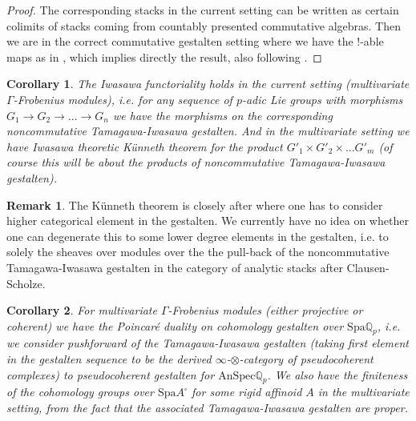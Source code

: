 \documentclass[12pt]{article}
\newtheorem{corollary}{Corollary}
\theoremstyle{definition}
\newtheorem{remark}{Remark}
\begin{document}
\begin{proof}
The corresponding stacks in the current setting can be written as certain colimits of stacks coming from countably presented commutative algebras. Then we are in the correct commutative gestalten setting where we have the !-able maps as in \cite[Corollary 5.3, Corollary 5.4]{5S5}, which implies directly the result, also following \cite{5Ga}.
\end{proof}



\begin{corollary}
The Iwasawa functoriality holds in the current setting (multivariate $\Gamma$-Frobenius modules), i.e. for any sequence of $p$-adic Lie groups with morphisms $G_1\rightarrow G_2\rightarrow ...\rightarrow G_n$ we have the morphisms on the corresponding noncommutative Tamagawa-Iwasawa gestalten. And in the multivariate setting we have Iwasawa theoretic K\"unneth theorem for the product $G'_1\times G'_2\times ...G'_m$ (of course this will be about the products of noncommutative Tamagawa-Iwasawa gestalten). 
\end{corollary}


\begin{remark}
The K\"unneth theorem is closely after \cite{5Ga} where one has to consider higher categorical element in the gestalten. We currently have no idea on whether one can degenerate this to some lower degree elements in the gestalten, i.e. to solely the sheaves over modules over the the pull-back of the noncommutative Tamagawa-Iwasawa gestalten in the category of analytic stacks after Clausen-Scholze.
\end{remark}


\begin{corollary}
For multivariate $\Gamma$-Frobenius modules (either projective or coherent) we have the Poincar\'e duality on cohomology gestalten over $\mathrm{Spa}\mathbb{Q}_p$, i.e. we consider pushforward of the Tamagawa-Iwasawa gestalten (taking first element in the gestalten sequence to be the derived $\infty$-$\otimes$-category of pseudocoherent complexes) to pseudocoherent gestalten for $\mathrm{AnSpec}\mathbb{Q}_p$. We also have the finiteness of the cohomology groups over $\mathrm{Spa}A^\square$ for some rigid affinoid $A$ in the multivariate setting, from the fact that the associated Tamagawa-Iwasawa gestalten are proper.
\end{corollary}
\end{document}
